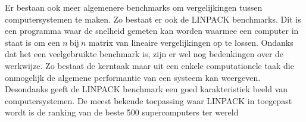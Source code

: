 	Er bestaan ook meer algemenere benchmarks om vergelijkingen tussen computersystemen te maken. Zo bestaat er ook de LINPACK benchmarks\cite{bron:LINPACKBENCHMARK}. Dit is een programma waar de snelheid gemeten kan worden waarmee een computer in staat is om een $n~ $bij$~ n$ matrix van lineaire vergelijkingen op te lossen. Ondanks dat het een veelgebruikte benchmark is, zijn er wel nog bedenkingen over de werkwijze. Zo bestaat de kerntaak maar uit een enkele computationele taak die onmogelijk de algemene performantie van een systeem kan weergeven. Desondanks geeft de LINPACK benchmark een goed karakteristiek beeld van computersystemen. De meest bekende toepassing waar LINPACK in toegepast wordt is de ranking van de beste 500 supercomputers ter wereld\cite{bron:LINPACKBENCHMARK500}





	

